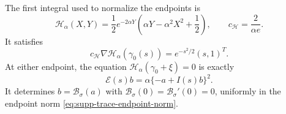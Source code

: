 The first integral used to normalize the endpoints is
\begin{equation}
 \mathscr H_\alpha(X,Y)
 =\frac12e^{-2\alpha Y}
   \left(\alpha Y-\alpha^2X^2+\frac12\right),\qquad
 c_{\mathscr H}=\frac2{\alpha e}.
 \label{eq:supp-first-integral}
\end{equation}
It satisfies
\begin{equation}
 c_{\mathscr H}\nabla\mathscr H_\alpha(\gamma_0(s))
 =e^{-s^2/2}(s,1)^T.
 \label{eq:supp-first-integral-adjoint}
\end{equation}
At either endpoint, the equation
\(\mathscr H_\alpha(\gamma_0+\xi)=0\) is exactly
\begin{equation}
 \mathcal E(s)b=\alpha\{-a+I(s)b\}^2.
 \label{eq:supp-endpoint-equation}
\end{equation}
It determines \(b=\mathcal B_\sigma(a)\) with
\(\mathcal B_\sigma(0)=\mathcal B_\sigma'(0)=0\), uniformly in the
endpoint norm \eqref{eq:supp-trace-endpoint-norm}.

